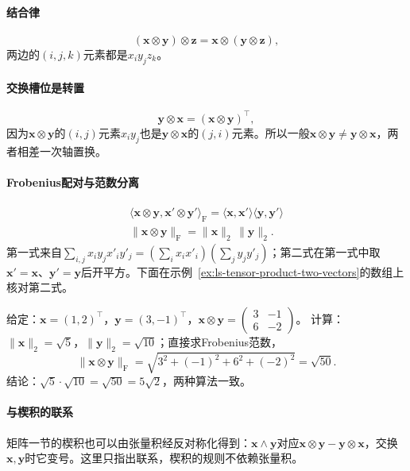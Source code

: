 \paragraph{结合律}
\[
 (\bm x\otimes\bm y)\otimes\bm z=\bm x\otimes(\bm y\otimes\bm z),
\]
两边的$(i,j,k)$元素都是$x_iy_jz_k$。

\paragraph{交换槽位是转置}
\[
 \bm y\otimes\bm x=(\bm x\otimes\bm y)^\top,
\]
因为$\bm x\otimes\bm y$的$(i,j)$元素$x_iy_j$也是$\bm y\otimes\bm x$的$(j,i)$元素。所以一般$\bm x\otimes\bm y\neq\bm y\otimes\bm x$，两者相差一次轴置换。

\paragraph{Frobenius配对与范数分离}
\[
 \begin{gathered}
\langle\bm x\otimes\bm y,\bm x'\otimes\bm y'\rangle_{\mathrm F}
 =\langle\bm x,\bm x'\rangle\langle\bm y,\bm y'\rangle\\
\lVert\bm x\otimes\bm y\rVert_{\mathrm F}=\lVert\bm x\rVert_2\,\lVert\bm y\rVert_2.
 \end{gathered}
\]
第一式来自$\sum_{i,j}x_iy_jx'_iy'_j=(\sum_ix_ix'_i)(\sum_jy_jy'_j)$；第二式在第一式中取$\bm x'=\bm x$、$\bm y'=\bm y$后开平方。下面在示例~\ref{ex:ls-tensor-product-two-vectors}的数组上核对第二式。
\begin{example}[张量积范数的数值核对]
\label{ex:ls-tensor-product-norm-check}
给定：$\bm x=(1,2)^\top$，$\bm y=(3,-1)^\top$，$\bm x\otimes\bm y=\left(\begin{smallmatrix}3&-1\\6&-2\end{smallmatrix}\right)$。
计算：$\lVert\bm x\rVert_2=\sqrt5$，$\lVert\bm y\rVert_2=\sqrt{10}$；直接求Frobenius范数，
\[
 \lVert\bm x\otimes\bm y\rVert_{\mathrm F}=\sqrt{3^2+(-1)^2+6^2+(-2)^2}=\sqrt{50}.
\]
结论：$\sqrt5\cdot\sqrt{10}=\sqrt{50}=5\sqrt2$，两种算法一致。
\end{example}

\paragraph{与楔积的联系}
矩阵一节的楔积也可以由张量积经反对称化得到：$\bm x\wedge\bm y$对应$\bm x\otimes\bm y-\bm y\otimes\bm x$，交换$\bm x,\bm y$时它变号。这里只指出联系，楔积的规则不依赖张量积。



